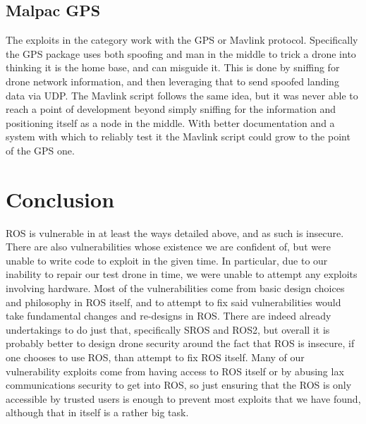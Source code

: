 \documentclass[IEEEtran,letterpaper,10pt,notitlepage,draftclsnofoot,onecolumn]{article}
\begin{document}
\subsection{Malpac GPS}
The exploits in the category work with the GPS or Mavlink protocol.
Specifically the GPS package uses both spoofing and man in the middle to trick a drone into thinking it is the home base, and can misguide it.
This is done by sniffing for drone network information, and then leveraging that to send spoofed landing data via UDP.
The Mavlink script follows the same idea, but it was never able to reach a point of development beyond simply sniffing for the information and positioning itself as a node in the middle.
With better documentation and a system with which to reliably test it the Mavlink script could grow to the point of the GPS one.

\section{Conclusion}
ROS is vulnerable in at least the ways detailed above, and as such is insecure. 
There are also vulnerabilities whose existence we are confident of, but were unable to write code to exploit in the given time. 
In particular, due to our inability to repair our test drone in time, we were unable to attempt any exploits involving hardware. 
Most of the vulnerabilities come from basic design choices and philosophy in ROS itself, and to attempt to fix said vulnerabilities would take fundamental changes and re-designs in ROS. 
There are indeed already undertakings to do just that, specifically SROS and ROS2, but overall it is probably better to design drone security around the fact that ROS is insecure, if one chooses to use ROS, than attempt to fix ROS itself. 
Many of our vulnerability exploits come from having access to ROS itself or by abusing lax communications security to get into ROS, so just ensuring that the ROS is only accessible by trusted users is enough to prevent most exploits that we have found, although that in itself is a rather big task.



\end{document}
